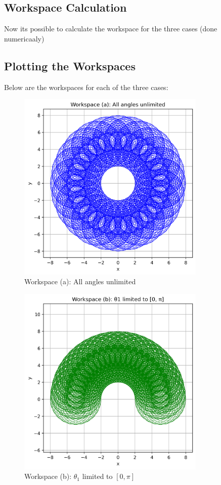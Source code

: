 \documentclass[12pt]{article}
\begin{document}
\subsection*{Workspace Calculation}

Now its possible to calculate the workspace for the three cases (done numericaaly)

\subsection*{Plotting the Workspaces}

Below are the workspaces for each of the three cases:

\begin{figure}[h!]
    \centering
    \includegraphics[width=0.8\textwidth]{workspace_case_a.png}
    \caption{Workspace (a): All angles unlimited}
    \label{fig:workspace_case_a}
\end{figure}

\begin{figure}[h!]
    \centering
    \includegraphics[width=0.8\textwidth]{workspace_case_b.png}
    \caption{Workspace (b): \( \theta_1 \) limited to \( [0, \pi] \)}
    \label{fig:workspace_case_b}
\end{figure}
\end{document}
